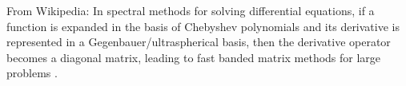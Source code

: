From Wikipedia: In spectral methods for solving differential equations, if a function is expanded in the basis of Chebyshev polynomials and its derivative is represented in a Gegenbauer/ultraspherical basis, then the derivative operator becomes a diagonal matrix, leading to fast banded matrix methods for large problems \parencite{2013-a-fast-and-well-conditioned-spectral-method}.
